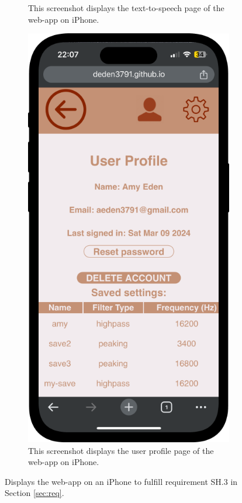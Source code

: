 \documentclass{l4proj}
\begin{document}
\begin{figure}
\begin{subfigure}[b]{0.30\textwidth}
        \caption{This screenshot displays the text-to-speech page of the web-app on iPhone.}
        \label{fig:text-page-phone}
    \end{subfigure}
    \begin{subfigure}[b]{0.30\textwidth}
        \includegraphics[width=\textwidth]{dissertation/images/profile-phone.png}
        \caption{This screenshot displays the user profile page of the web-app on iPhone.}
        \label{fig:profile-phone}
    \end{subfigure}
    \caption{Displays the web-app on an iPhone to fulfill requirement SH.3 in Section \ref{sec:req}.}
    \label{fig:phone}
\end{figure}
\end{document}

